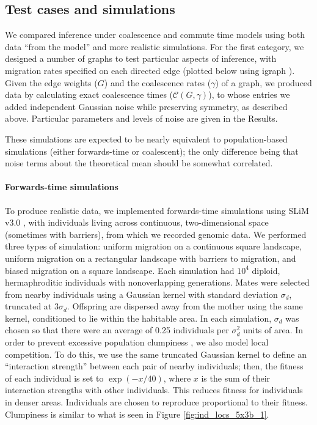 \documentclass{article}
\begin{document}
\subsection*{Test cases and simulations}

We compared inference under coalescence and commute time models
using both data ``from the model'' and more realistic simulations.
For the first category, we designed a number of graphs to test particular aspects of inference,
with migration rates specified on each directed edge
(plotted below using igraph \citep{igraph}).
Given the edge weights ($G$) and the coalescence rates ($\gamma$) of a graph,
we produced data by calculating exact coalescence times ($\mathcal{C}(G,\gamma)$),
to whose entries we added independent Gaussian noise while preserving symmetry,
as described above.
Particular parameters and levels of noise are given in the Results.

These simulations are expected to be nearly equivalent to population-based simulations
(either forwards-time or coalescent);
the only difference being that noise terms about the theoretical mean should be somewhat correlated.

\paragraph{Forwards-time simulations}
To produce realistic data, we implemented forwards-time simulations using SLiM v3.0 \citep{haller2017},
with individuals living across continuous, two-dimensional space (sometimes with barriers),
from which we recorded genomic data.
We performed three types of simulation:
uniform migration on a continuous square landscape, 
uniform migration on a rectangular landscape with barriers to migration, 
and biased migration on a square landscape.
Each simulation had $10^4$ diploid, hermaphroditic individuals with nonoverlapping generations.
Mates were selected from nearby individuals using a Gaussian kernel with standard deviation $\sigma_d$,
truncated at $3 \sigma_d$.
Offspring are dispersed away from the mother using the same kernel,
conditioned to lie within the habitable area.
In each simulation, $\sigma_d$ was chosen 
so that there were an average of 0.25 individuals per $\sigma_d^2$ units of area.
In order to prevent excessive population clumpiness \citep{felsensten1975pain}, 
we also model local competition. 
To do this, we use the same truncated Gaussian kernel to define an ``interaction strength''
between each pair of nearby individuals;
then, the fitness of each individual is set to $\exp(-x/40)$, 
where $x$ is the sum of their interaction strengths with other individuals.
This reduces fitness for individuals in denser areas.
Individuals are chosen to reproduce proportional to their fitness.
Clumpiness is similar to what is seen in 
Figure \ref{fig:ind_locs_5x3b_1}.
\end{document}
